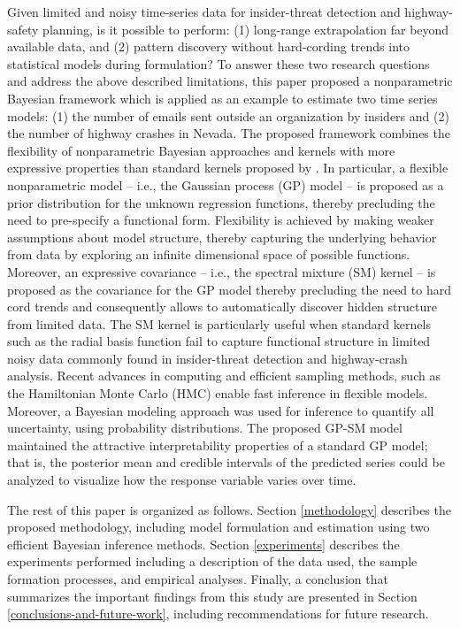 \documentclass[letterpaper]{article}
\begin{document}
Given limited and noisy time-series data for insider-threat detection and highway-safety planning, is it possible to perform: (1) long-range extrapolation far beyond available data, and (2) pattern discovery without hard-cording trends into statistical models during formulation? To answer these two research questions and address the above described limitations, this paper proposed a nonparametric Bayesian framework which is applied as an example to estimate two time series models: (1) the number of emails sent outside an organization by insiders and (2) the number of highway crashes in Nevada. The proposed framework combines the flexibility of nonparametric Bayesian approaches \citep{williams2006gaussian,hjort2010bayesian,ghahramani2015probabilistic} and kernels with more expressive properties \citep{wilson2013gaussian, duvenaud2014automatic} than standard kernels proposed by \cite{williams2006gaussian}. In particular, a flexible nonparametric model -- i.e., the Gaussian process (GP) model --  is proposed as a prior distribution for the unknown regression functions, thereby precluding the need to pre-specify a functional form. Flexibility is achieved by making weaker assumptions about model structure, thereby capturing the underlying behavior from data by exploring an infinite dimensional space of possible functions. Moreover, an expressive covariance -- i.e., the spectral mixture (SM) kernel \citep{wilson2014covariance} -- is proposed as the covariance for the GP model thereby precluding the need to hard cord trends and consequently allows to automatically discover hidden structure from limited data. The SM kernel is particularly useful when standard kernels such as the radial basis function fail to capture functional structure \citep{schulz2017compositional} in limited noisy data commonly found in insider-threat detection and highway-crash analysis. Recent advances in computing and efficient sampling methods, such as the Hamiltonian Monte Carlo (HMC) \citep{hoffman2014no} enable fast inference in flexible models. Moreover, a Bayesian modeling approach was used for inference to quantify all uncertainty, using probability distributions. The proposed GP-SM model maintained the attractive interpretability properties of a standard GP model; that is, the posterior mean and credible intervals of the predicted series could be analyzed to visualize how the response variable varies over time. 

The rest of this paper is organized as follows. Section \ref{methodology} describes the proposed methodology, including model formulation and estimation using two efficient Bayesian inference methods. Section \ref{experiments} describes the experiments performed including a description of the data used, the sample formation processes, and empirical analyses. Finally, a conclusion that summarizes the important findings from this study are presented in Section \ref{conclusions-and-future-work}, including recommendations for future research.
 
\end{document}
